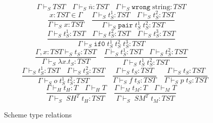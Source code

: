 \begin{figure}
\[
\Gamma\vdash_{S}TST
\quad
\Gamma\vdash_{S}\overline{n}:TST
\quad
\Gamma\vdash_{S}\mathtt{wrong}\;\mathrm{string}:TST
\]
\[
\frac{x:TST\in\Gamma}{\Gamma\vdash_{S}x:TST}
\quad
\frac{\Gamma\vdash_{S}t_{S}^{1}:TST\quad\Gamma\vdash_{S}t_{S}^{2}:TST}{\Gamma\vdash_{S}\mathtt{pair}\;t_{S}^{1}\;t_{S}^{2}:TST}
\]
\[
\frac{\Gamma\vdash_{S}t_{S}^{1}:TST\quad\Gamma\vdash_{S}t_{S}^{2}:TST\quad\Gamma\vdash_{S}t_{S}^{3}:TST}{\Gamma\vdash_{S}\mathtt{if0}\;t_{S}^{1}\;t_{S}^{2}\;t_{S}^{3}:TST}
\]
\[
\frac{\Gamma,x:TST\vdash_{S}t_{S}:TST}{\Gamma\vdash_{S}\lambda x.t_{S}:TST}
\quad
\frac{\Gamma\vdash_{S}t_{S}^{1}:TST\quad\Gamma\vdash_{S}t_{S}^{2}:TST}{\Gamma\vdash_{S}t_{S}^{1}\;t_{S}^{2}:TST}
\]
\[
\quad
\frac{\Gamma\vdash_{S}t_{S}^{1}:TST\quad\Gamma\vdash_{S}t_{S}^{2}:TST}{\Gamma\vdash_{S}o\;t_{S}^{1}\;t_{S}^{2}:TST}
\quad
\frac{\Gamma\vdash_{S}t_{S}:TST}{\Gamma\vdash_{S}f\;t_{S}:TST}
\quad
\frac{\Gamma\vdash_{S}t_{S}:TST}{\Gamma\vdash_{S}p\;t_{S}:TST}
\]
\[
\frac{\Gamma\vdash_{H}t_{H}:T\quad\Gamma\vdash_{H}T}{\Gamma\vdash_{S}\;SH^{T}\;t_{H}:TST}
\quad
\frac{\Gamma\vdash_{M}t_{M}:T\quad\Gamma\vdash_{M}T}{\Gamma\vdash_{S}\;SM^{T}\;t_{M}:TST}
\]
\caption{Scheme type relations}
\label{str}
\end{figure}